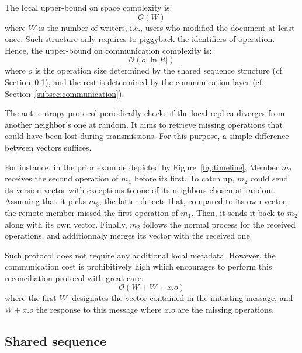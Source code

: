 \begin{asparadesc}
  The local upper-bound on space complexity is:
  \begin{equation}
    \mathcal{O}(W)
  \end{equation}
  where $W$ is the number of writers, i.e., users who modified the
  document at least once.  Such structure only requires to piggyback the
  identifiers of operation. Hence, the upper-bound on communication complexity
  is:
  \begin{equation}
    \mathcal{O}(o.\ln R|)
  \end{equation}
  where $o$ is the operation size determined by the shared sequence structure
  (cf. Section~\ref{subsec:sequence}), and the rest is determined by the
  communication layer (cf. Section~\ref{subsec:communication}).
  
\item [The anti-entropy protocol] periodically checks if the local replica
  diverges from another neighbor's one at random. It aims to retrieve missing
  operations that could have been lost during transmissions. For this purpose, a
  simple difference between vectors suffices.

  For instance, in the prior example depicted by Figure~\ref{fig:timeline},
  Member $m_2$ receives the second operation of $m_1$ before its first. To catch
  up, $m_2$ could send its version vector with exceptions to one of its
  neighbors chosen at random. Assuming that it picks $m_3$, the latter detects
  that, compared to its own vector, the remote member missed the first operation
  of $m_1$. Then, it sends it back to $m_2$ along with its own vector. Finally,
  $m_2$ follows the normal process for the received operations, and additionnaly
  merges its vector with the received one.

  Such protocol does not require any additional local metadata. However, the
  communication cost is prohibitively high which encourages to perform this
  reconciliation protocol with great care:
  \begin{equation}
    \mathcal{O}(W+W+x.o)
  \end{equation}
  where the first $W|$ designates the vector contained in the initiating
  message, and $W+x.o$ the response to this message where $x.o$ are the missing
  operations.
\end{asparadesc}

\subsection{Shared sequence}
\label{subsec:sequence}

